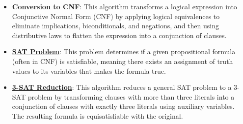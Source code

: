 \documentclass{article}%
\begin{document}
\begin{itemize}[leftmargin=*]%
\item \href{https://purdue.brightspace.com/d2l/common/assets/pdfjs-d2l-dist/1.0.14-legacy/web/viewer.html?file=\%2Fcontent\%2Fenforced\%2F1095467-wl.202510.CS.24300.001\%2F13L1-Logic.pdf\%3Fou\%3D1095467\&lang=en-us\&container=d2l-fileviewer-rendered-pdf\&fullscreen=d2l-fileviewer-rendered-pdf-dialog\&height=667#page=17}{\textbf{Conversion to CNF}}: This algorithm transforms a logical expression into Conjunctive Normal Form (CNF) by applying logical equivalences to eliminate implications, biconditionals, and negations, and then using distributive laws to flatten the expression into a conjunction of clauses.%
\item \href{https://purdue.brightspace.com/d2l/common/assets/pdfjs-d2l-dist/1.0.14-legacy/web/viewer.html?file=\%2Fcontent\%2Fenforced\%2F1095467-wl.202510.CS.24300.001\%2F13L1-Logic.pdf\%3Fou\%3D1095467\&lang=en-us\&container=d2l-fileviewer-rendered-pdf\&fullscreen=d2l-fileviewer-rendered-pdf-dialog\&height=667#page=15}{\textbf{SAT Problem}}: This problem determines if a given propositional formula (often in CNF) is satisfiable, meaning there exists an assignment of truth values to its variables that makes the formula true.%
\item \href{https://purdue.brightspace.com/d2l/common/assets/pdfjs-d2l-dist/1.0.14-legacy/web/viewer.html?file=\%2Fcontent\%2Fenforced\%2F1095467-wl.202510.CS.24300.001\%2F13L1-Logic.pdf\%3Fou\%3D1095467\&lang=en-us\&container=d2l-fileviewer-rendered-pdf\&fullscreen=d2l-fileviewer-rendered-pdf-dialog\&height=667#page=24}{\textbf{3{-}SAT Reduction}}: This algorithm reduces a general SAT problem to a 3-SAT problem by transforming clauses with more than three literals into a conjunction of clauses with exactly three literals using auxiliary variables. The resulting formula is equisatisfiable with the original.%
\end{itemize}%
\end{document}
